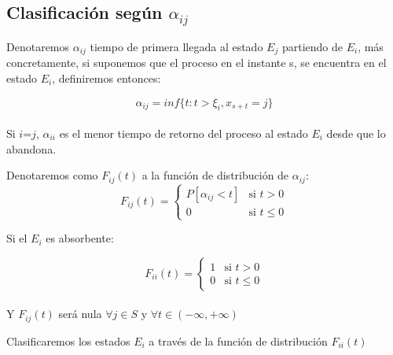 \documentclass[12pt,a4paper]{article}
\begin{document}
\subsection{Clasificación según \textbf{$\alpha_{ij}$}}
 Denotaremos $\alpha_{ij}$ tiempo de primera llegada al estado $E_{j}$ partiendo de $E_{i}$, más concretamente, si suponemos que el proceso en el instante s, se encuentra en el estado $E_{i}$, definiremos entonces: 
 
	 \begin{equation*}
 \alpha_{ij}=inf \{ t: t>\xi_{i}, x_{s+t}=j \}
	 \end{equation*}
 \\
 
 Si $i$=$j$, $\alpha_{ii}$ es el menor tiempo de retorno del proceso al estado $E_{i}$ desde que lo abandona.
 
 \begin{definition} Denotaremos como $F_{ij}(t)$ a la función de distribución de $\alpha_{ij}$:
 	\begin{equation*}
 		F_{ij}(t) = \left\{
 		\begin{array}{cl}
 			P[\alpha_{ij}<t]&\mbox{si } t > 0\\
 			0&\mbox{si } t\leq 0
 		\end{array}\right.
 	\end{equation*}
 \end{definition}
  
  \begin{definition} Si el $E_{i}$ es absorbente: 
  	
  	\begin{equation*}
  		F_{ii}(t) = \left\{
  		\begin{array}{cl}
  		1&\mbox{si } t > 0\\
  			0&\mbox{si } t\leq 0
  		\end{array}\right.
  	\end{equation*}
  	   		\\
  Y $F_{ij}(t)$ será nula  $\forall j \in S$ y $\forall t \in (-\infty,+\infty)$
    \end{definition}
    \begin{flushleft}
    	Clasificaremos los estados $E_{i}$ a través de la función de distribución $F_{ii}(t)$
    \end{flushleft}
    
\end{document}
